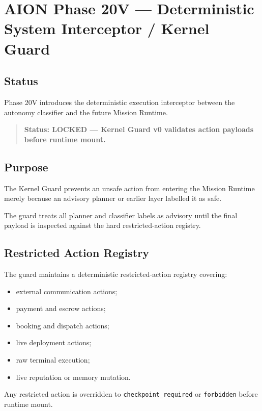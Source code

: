 \section{AION Phase 20V --- Deterministic System Interceptor / Kernel Guard}
\label{sec:aion-phase20v-kernel-guard}

\subsection{Status}

Phase 20V introduces the deterministic execution interceptor between the autonomy classifier and the future Mission Runtime.

\begin{quote}
\textbf{Status: LOCKED --- Kernel Guard v0 validates action payloads before runtime mount.}
\end{quote}

\subsection{Purpose}

The Kernel Guard prevents an unsafe action from entering the Mission Runtime merely because an advisory planner or earlier layer labelled it as safe.

The guard treats all planner and classifier labels as advisory until the final payload is inspected against the hard restricted-action registry.

\subsection{Restricted Action Registry}

The guard maintains a deterministic restricted-action registry covering:

\begin{itemize}
  \item external communication actions;
  \item payment and escrow actions;
  \item booking and dispatch actions;
  \item live deployment actions;
  \item raw terminal execution;
  \item live reputation or memory mutation.
\end{itemize}

Any restricted action is overridden to \texttt{checkpoint\_required} or \texttt{forbidden} before runtime mount.

